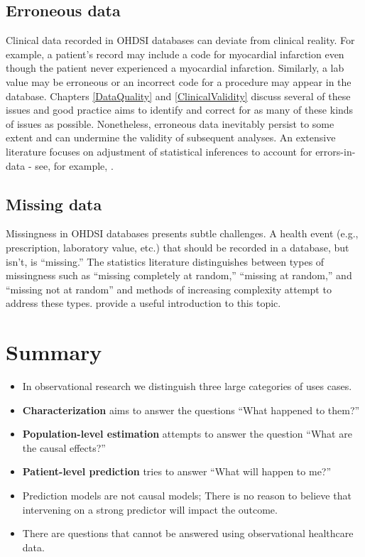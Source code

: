 \documentclass[11pt]{book}
\theoremstyle{definition}
\theoremstyle{definition}
\theoremstyle{definition}
\theoremstyle{remark}
\let\BeginKnitrBlock\begin \let\EndKnitrBlock\end
\begin{document}
\hypertarget{erroneous-data}{%
\subsection{Erroneous data}\label{erroneous-data}}

Clinical data recorded in OHDSI databases can deviate from clinical reality. For example, a patient's record may include a code for myocardial infarction even though the patient never experienced a myocardial infarction. Similarly, a lab value may be erroneous or an incorrect code for a procedure may appear in the database. Chapters \ref{DataQuality} and \ref{ClinicalValidity} discuss several of these issues and good practice aims to identify and correct for as many of these kinds of issues as possible. Nonetheless, erroneous data inevitably persist to some extent and can undermine the validity of subsequent analyses. An extensive literature focuses on adjustment of statistical inferences to account for errors-in-data - see, for example, \citet{fuller2009measurement}.

\hypertarget{missing-data}{%
\subsection{Missing data}\label{missing-data}}

Missingness in OHDSI databases presents subtle challenges. A health event (e.g., prescription, laboratory value, etc.) that should be recorded in a database, but isn't, is ``missing.'' The statistics literature distinguishes between types of missingness such as ``missing completely at random,'' ``missing at random,'' and ``missing not at random'' and methods of increasing complexity attempt to address these types. \citet{perkins2017principled} provide a useful introduction to this topic.

\hypertarget{summary-4}{%
\section{Summary}\label{summary-4}}

\BeginKnitrBlock{rmdsummary}
\begin{itemize}
\item
  In observational research we distinguish three large categories of uses cases.
\item
  \textbf{Characterization} aims to answer the questions ``What happened to them?''
\item
  \textbf{Population-level estimation} attempts to answer the question ``What are the causal effects?''
\item
  \textbf{Patient-level prediction} tries to answer ``What will happen to me?''
\item
  Prediction models are not causal models; There is no reason to believe that intervening on a strong predictor will impact the outcome.
\item
  There are questions that cannot be answered using observational healthcare data.
\end{itemize}
\EndKnitrBlock{rmdsummary}
\end{document}
